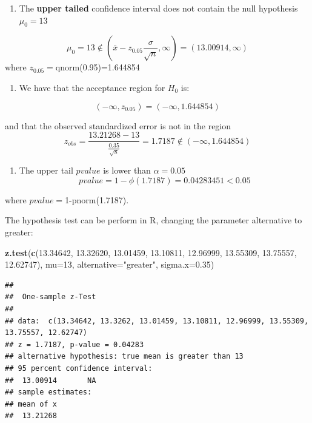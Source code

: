 \documentclass[
]{book}
\newenvironment{Shaded}{\begin{snugshade}}{\end{snugshade}}
\newcommand{\AttributeTok}[1]{\textcolor[rgb]{0.13,0.29,0.53}{#1}}
\newcommand{\DecValTok}[1]{\textcolor[rgb]{0.00,0.00,0.81}{#1}}
\newcommand{\FloatTok}[1]{\textcolor[rgb]{0.00,0.00,0.81}{#1}}
\newcommand{\FunctionTok}[1]{\textcolor[rgb]{0.13,0.29,0.53}{\textbf{#1}}}
\newcommand{\NormalTok}[1]{#1}
\newcommand{\StringTok}[1]{\textcolor[rgb]{0.31,0.60,0.02}{#1}}
\providecommand{\tightlist}{%
  \setlength{\itemsep}{0pt}\setlength{\parskip}{0pt}}
\begin{document}
\begin{enumerate}
\def\labelenumi{\arabic{enumi}.}
\tightlist
\item
  The \textbf{upper tailed} confidence interval does not contain the null hypothesis \(\mu_0=13\)
\end{enumerate}

\[\mu_0=13 \notin (\bar{x}-z_{0.05} \frac{\sigma}{\sqrt{n}}, \infty)=(13.00914, \infty)\]
where \(z_{0.05}=\)qnorm(0.95)=1.644854

\begin{enumerate}
\def\labelenumi{\arabic{enumi}.}
\setcounter{enumi}{1}
\tightlist
\item
  We have that the acceptance region for \(H_0\) is:
\end{enumerate}

\[(-\infty, z_{0.05})=( -\infty,  1.644854)\]

and that the observed standardized error is not in the region
\[z_{obs} =  \frac{13.21268-13}{\frac{0.35}{\sqrt{8}}}=1.7187 \notin ( -\infty,  1.644854)\]

\begin{enumerate}
\def\labelenumi{\arabic{enumi}.}
\setcounter{enumi}{2}
\tightlist
\item
  The upper tail \(pvalue\) is lower than \(\alpha=0.05\)
  \[pvalue=1-\phi(1.7187)=0.04283451 <0.05\]
\end{enumerate}

where \(pvalue=\)1-pnorm(1.7187).

The hypothesis test can be perform in R, changing the parameter alternative to greater:

\begin{Shaded}
\begin{Highlighting}[]
\FunctionTok{z.test}\NormalTok{(}\FunctionTok{c}\NormalTok{(}\FloatTok{13.34642}\NormalTok{, }\FloatTok{13.32620}\NormalTok{, }\FloatTok{13.01459}\NormalTok{, }\FloatTok{13.10811}\NormalTok{,}
         \FloatTok{12.96999}\NormalTok{, }\FloatTok{13.55309}\NormalTok{, }\FloatTok{13.75557}\NormalTok{, }\FloatTok{12.62747}\NormalTok{), }
       \AttributeTok{mu=}\DecValTok{13}\NormalTok{, }\AttributeTok{alternative=}\StringTok{"greater"}\NormalTok{, }\AttributeTok{sigma.x=}\FloatTok{0.35}\NormalTok{)}
\end{Highlighting}
\end{Shaded}

\begin{verbatim}
## 
##  One-sample z-Test
## 
## data:  c(13.34642, 13.3262, 13.01459, 13.10811, 12.96999, 13.55309,     13.75557, 12.62747)
## z = 1.7187, p-value = 0.04283
## alternative hypothesis: true mean is greater than 13
## 95 percent confidence interval:
##  13.00914       NA
## sample estimates:
## mean of x 
##  13.21268
\end{verbatim}
\end{document}

